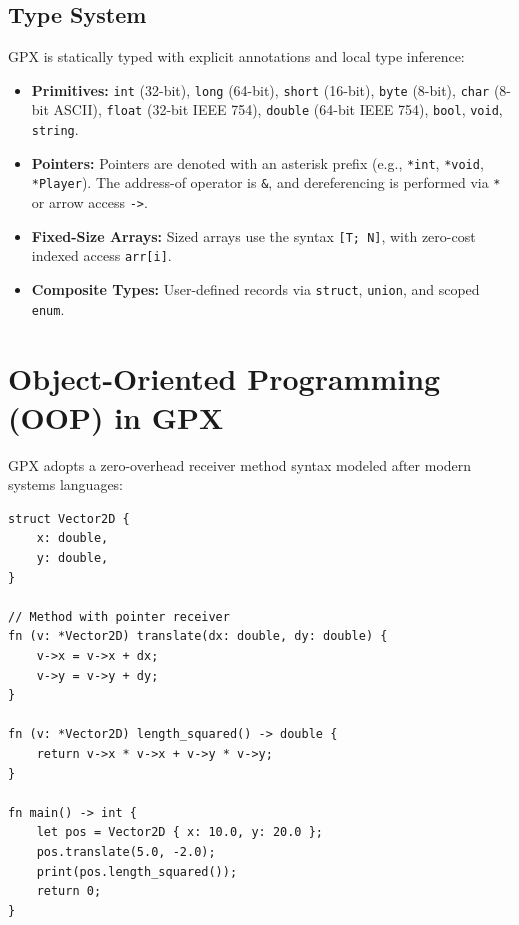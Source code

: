 \documentclass[11pt,a4paper]{report}
\begin{document}
\section{Type System}
GPX is statically typed with explicit annotations and local type inference:
\begin{itemize}
    \item \textbf{Primitives:} \texttt{int} (32-bit), \texttt{long} (64-bit), \texttt{short} (16-bit), \texttt{byte} (8-bit), \texttt{char} (8-bit ASCII), \texttt{float} (32-bit IEEE 754), \texttt{double} (64-bit IEEE 754), \texttt{bool}, \texttt{void}, \texttt{string}.
    \item \textbf{Pointers:} Pointers are denoted with an asterisk prefix (e.g., \texttt{*int}, \texttt{*void}, \texttt{*Player}). The address-of operator is \texttt{\&}, and dereferencing is performed via \texttt{*} or arrow access \texttt{->}.
    \item \textbf{Fixed-Size Arrays:} Sized arrays use the syntax \texttt{[T; N]}, with zero-cost indexed access \texttt{arr[i]}.
    \item \textbf{Composite Types:} User-defined records via \texttt{struct}, \texttt{union}, and scoped \texttt{enum}.
\end{itemize}

\chapter{Object-Oriented Programming (OOP) in GPX}

GPX adopts a zero-overhead receiver method syntax modeled after modern systems languages:

\begin{lstlisting}[language=gpx,caption={Receiver Method and Struct Definition}]
struct Vector2D {
    x: double,
    y: double,
}

// Method with pointer receiver
fn (v: *Vector2D) translate(dx: double, dy: double) {
    v->x = v->x + dx;
    v->y = v->y + dy;
}

fn (v: *Vector2D) length_squared() -> double {
    return v->x * v->x + v->y * v->y;
}

fn main() -> int {
    let pos = Vector2D { x: 10.0, y: 20.0 };
    pos.translate(5.0, -2.0);
    print(pos.length_squared());
    return 0;
}
\end{lstlisting}
\end{document}
